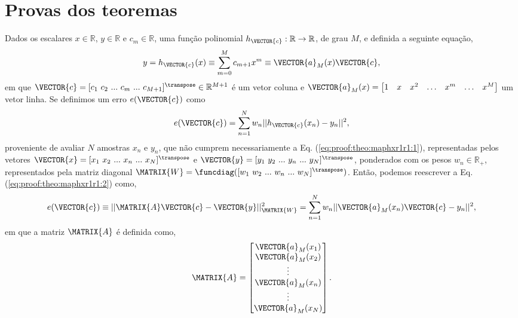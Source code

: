 \section{Provas dos teoremas}
 
\begin{myproofT}\label{proof:theo:maphxr1r1}
Dados
os escalares $x \in \mathbb{R}$, $y \in \mathbb{R}$ e $c_m \in \mathbb{R}$,
uma função polinomial $h_{\VECTOR{c}}:\mathbb{R} \rightarrow \mathbb{R}$, de grau $M$, e 
definida a seguinte equação,
\begin{equation}\label{eq:proof:theo:maphxr1r1:1}
y=h_{\VECTOR{c}}(x)\equiv \sum_{m=0}^{M}c_{m+1} x^m\equiv \VECTOR{a}_M(x)\VECTOR{c},
\end{equation}
em que $\VECTOR{c}=[c_1~ c_2~ ...~ c_m~ ...~ c_{M+1}]^{\transpose} \in \mathbb{R}^{M+1}$ é um vetor coluna e
$\VECTOR{a}_M(x)=\begin{bmatrix} 
1& x& x^2& \hdots & x^m& \hdots& x^M
\end{bmatrix}$ um vetor linha.
Se definimos um erro $e(\VECTOR{c})$ como
\begin{equation}\label{eq:proof:theo:maphxr1r1:2}
e(\VECTOR{c}) =  \sum_{n=1}^{N} w_n||h_{\VECTOR{c}}(x_n)-y_n||^2,
\end{equation}
proveniente de avaliar $N$ amostras $x_n$ e $y_n$, 
que não cumprem necessariamente a Eq. (\ref{eq:proof:theo:maphxr1r1:1}), 
representadas pelos vetores $\VECTOR{x}=[x_1~ x_2~ ...~ x_n~ ...~ x_N]^{\transpose}$ e $\VECTOR{y}=[y_1~ y_2~ ...~ y_n~ ...~ y_N]^{\transpose}$,
ponderados com os pesos $w_n \in \mathbb{R}_+$, representados pela matriz diagonal $\MATRIX{W}=\funcdiag([w_1~ w_2~ ...~ w_n~ ...~ w_N]^{\transpose})$.
Então, podemos reescrever a Eq. (\ref{eq:proof:theo:maphxr1r1:2}) como,
\begin{equation}\label{eq:proof:theo:maphxr1r1:3}
e(\VECTOR{c}) \equiv ||\MATRIX{A}\VECTOR{c}-\VECTOR{y}||_{\MATRIX{W}}^2 =  \sum_{n=1}^{N} w_n||\VECTOR{a}_M(x_n)\VECTOR{c}-y_n||^2,
\end{equation}
em que a matriz $\MATRIX{A}$ é definida como,
\begin{equation}\label{eq:proof:maphxr1r1:4}
\MATRIX{A}=\begin{bmatrix}
\VECTOR{a}_M(x_1)\\
\VECTOR{a}_M(x_2)\\
\vdots\\
\VECTOR{a}_M(x_n)\\
\vdots\\
\VECTOR{a}_M(x_N)\\
\end{bmatrix}.
\end{equation}



\end{myproofT}
